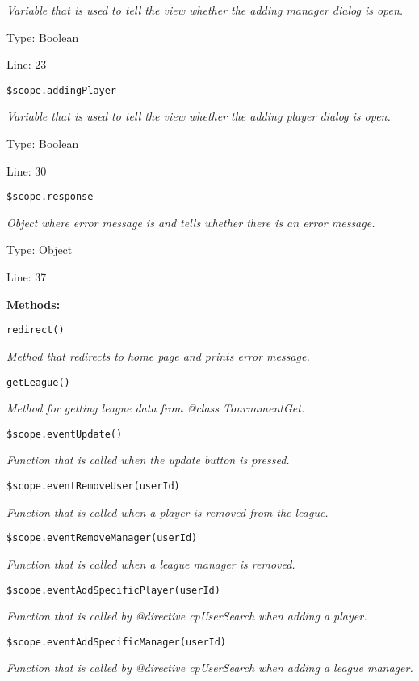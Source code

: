{\scriptsize
\textit{Variable that is used to tell the view whether the adding manager dialog is open.}

Type: Boolean

Line: 23

}
\texttt{\$scope.addingPlayer}

{\scriptsize
\textit{Variable that is used to tell the view whether the adding player dialog is open.}

Type: Boolean

Line: 30

}
\texttt{\$scope.response}

{\scriptsize
\textit{Object where error message is and tells whether there is an error message.}

Type: Object

Line: 37

}
\textbf{Methods:}

\texttt{redirect()}

{\scriptsize
\textit{Method that redirects to home page and prints error message.}

}

\texttt{getLeague()}

{\scriptsize
\textit{Method for getting league data from @class TournamentGet.}

}

\texttt{\$scope.eventUpdate()}

{\scriptsize
\textit{Function that is called when the update button is pressed.}

}

\texttt{\$scope.eventRemoveUser(userId)}

{\scriptsize
\textit{Function that is called when a player is removed from the league.}

}

\texttt{\$scope.eventRemoveManager(userId)}

{\scriptsize
\textit{Function that is called when a league manager is removed.}

}

\texttt{\$scope.eventAddSpecificPlayer(userId)}

{\scriptsize
\textit{Function that is called by @directive cpUserSearch when adding a player.}

}

\texttt{\$scope.eventAddSpecificManager(userId)}

{\scriptsize
\textit{Function that is called by @directive cpUserSearch when adding a league manager.}

}

